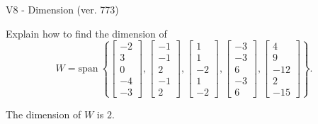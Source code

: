 \begin{exercise}
  \begin{exerciseTitle}V8 - Dimension (ver. 773)\end{exerciseTitle}
  \begin{exerciseStatement}
    Explain how to find the dimension of 
\[W=\mathrm{span}\ \left\{\left[\begin{array}{r}
-2 \\
3 \\
0 \\
-4 \\
-3
\end{array}\right] , \left[\begin{array}{r}
-1 \\
-1 \\
2 \\
-1 \\
2
\end{array}\right] , \left[\begin{array}{r}
1 \\
1 \\
-2 \\
1 \\
-2
\end{array}\right] , \left[\begin{array}{r}
-3 \\
-3 \\
6 \\
-3 \\
6
\end{array}\right] , \left[\begin{array}{r}
4 \\
9 \\
-12 \\
2 \\
-15
\end{array}\right]\right\}.\]



  \end{exerciseStatement}
  \begin{exerciseAnswer}
   The dimension of \(W\) is  \(2\).
  


  \end{exerciseAnswer}
\end{exercise}